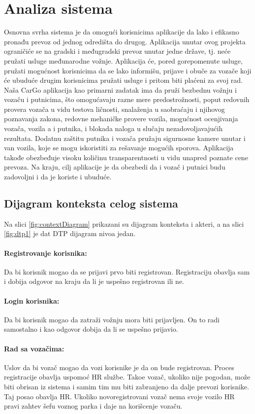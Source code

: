 \section{\bfseries Analiza sistema}

Osnovna svrha sistema je da omogući korisnicima aplikacije da lako i efikasno pronađu prevoz od jednog odredišta do drugog. Aplikacija unutar ovog projekta ograničiće se na gradski i međugradski prevoz unutar jedne države, tj. neće pružati usluge međunarodne vožnje. Aplikacija će, pored gorepomenute usluge, pružati mogućnost korisnicima da se lako informišu, prijave i obuče za vozače koji će ubuduće drugim korisnicima pružati usluge i pritom biti plaćeni za svoj rad. Naša CarGo aplikacija kao primarni zadatak ima da pruži bezbednu vožnju i vozaču i putnicima, što omogućavaju razne mere predostrožnosti, poput redovnih provera vozača u vidu testova ličnosti, snalaženja u saobraćaju i njihovog poznavanja zakona, redovne mehaničke provere vozila, mogućnost ocenjivanja vozača, vozila a i putnika, i blokada naloga u slučaju nezadovoljavajućih rezultata. Dodatnu zaštitu putnika i vozača pružaju sigurnosne kamere unutar i van vozila, koje se mogu iskoristiti za rešavanje mogućih sporova. Aplikacija takođe obezbeđuje visoku količinu transparentnosti u vidu unapred poznate cene prevoza. Na kraju, cilj aplikacije je da obezbedi da i vozač i putnici budu zadovoljni i da je koriste i ubuduće.
     
\subsection{\bfseries Dijagram konteksta celog sistema}

\quad Na slici \ref{fig:contextDiagram} prikazani su dijagram konteksta i akteri, a na slici \ref{fig:dtp1} je dat DTP dijagram nivoa jedan.
\paragraph{Registrovanje korisnika:}
    Da bi korisnik mogao da se prijavi prvo biti registrovan. Registraciju obavlja sam i dobija odgovor na kraju da li je uspe\v sno registrovan ili ne.
\paragraph{Login korisnika:}
    Da bi korisnik mogao da zatra\v zi vo\v znju mora biti prijavljen. On to radi samostalno i kao odgovor dobija da li se uspe\v sno prijavio.
\paragraph{Rad sa voza\v cima:}
    Uslov da bi voza\v c mogao da vozi korisnike je da on bude registrovan. Proces registracije obavlja uspomo\' c HR slu\v zbe. Tako\dj e voza\v c, ukoliko nije pogodan, mo\v ze biti obrisan iz sistema i samim tim mu biti zabranjeno da dalje prevozi korisnike. Taj posao obavlja HR. Ukoliko novoregistrovani voza\v c nema svoje vozilo HR pravi zahtev \v sefu voznog parka i daje na kori\v scenje voza\v cu.
